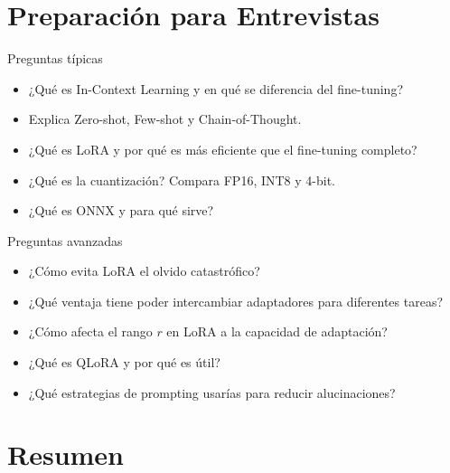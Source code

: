 \documentclass[aspectratio=169, 10pt, xcolor=table]{beamer}
\begin{document}
\section{Preparación para Entrevistas}

\begin{frame}{Preguntas típicas}
    \begin{itemize}
        \item ¿Qué es In-Context Learning y en qué se diferencia del fine-tuning?
        \item Explica Zero-shot, Few-shot y Chain-of-Thought.
        \item ¿Qué es LoRA y por qué es más eficiente que el fine-tuning completo?
        \item ¿Qué es la cuantización? Compara FP16, INT8 y 4-bit.
        \item ¿Qué es ONNX y para qué sirve?
    \end{itemize}
\end{frame}

\begin{frame}{Preguntas avanzadas}
    \begin{itemize}
        \item ¿Cómo evita LoRA el olvido catastrófico?
        \item ¿Qué ventaja tiene poder intercambiar adaptadores para diferentes tareas?
        \item ¿Cómo afecta el rango $r$ en LoRA a la capacidad de adaptación?
        \item ¿Qué es QLoRA y por qué es útil?
        \item ¿Qué estrategias de prompting usarías para reducir alucinaciones?
    \end{itemize}
\end{frame}



\section{Resumen}
\end{document}
